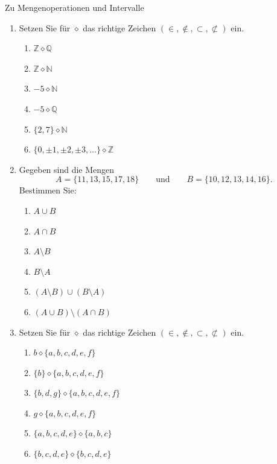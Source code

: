 \clearpage

\begin{ueb}
    {Zu Mengenoperationen und Intervalle}{}
    \begin{enumerate}
        \item Setzen Sie für \(\diamond\) das richtige Zeichen
              \(\left(\in,\notin,\subset,\not\subset\right)\) ein.

              \begin{enumerate}
                  \item \(\mathbb{Z} \diamond \mathbb{Q}\)
                  \item \(\mathbb{Z} \diamond \mathbb{N}\)
                  \item \(-5 \diamond \mathbb{N}\)
                  \item \(-5 \diamond \mathbb{Q}\)
                  \item \(\{2,7\} \diamond \mathbb{N}\)
                  \item \(\{0,\pm1,\pm2,\pm3,\ldots\} \diamond \mathbb{Z}\)
              \end{enumerate}

        \item Gegeben sind die Mengen
              \[
                  A=\{11,13,15,17,18\}
                  \qquad\text{und}\qquad
                  B=\{10,12,13,14,16\}.
              \]
              Bestimmen Sie:

              \begin{enumerate}
                  \item \(A \cup B\)
                  \item \(A \cap B\)
                  \item \(A \setminus B\)
                  \item \(B \setminus A\)
                  \item \((A \setminus B)\cup(B \setminus A)\)
                  \item \((A \cup B)\setminus(A \cap B)\)
              \end{enumerate}

        \item Setzen Sie für \(\diamond\) das richtige Zeichen
              \(\left(\in,\notin,\subset,\not\subset\right)\) ein.

              \begin{enumerate}
                  \item \(b \diamond \{a,b,c,d,e,f\}\)
                  \item \(\{b\} \diamond \{a,b,c,d,e,f\}\)
                  \item \(\{b,d,g\} \diamond \{a,b,c,d,e,f\}\)
                  \item \(g \diamond \{a,b,c,d,e,f\}\)
                  \item \(\{a,b,c,d,e\} \diamond \{a,b,c\}\)
                  \item \(\{b,c,d,e\} \diamond \{b,c,d,e\}\)
              \end{enumerate}


\end{enumerate}
\end{ueb}
